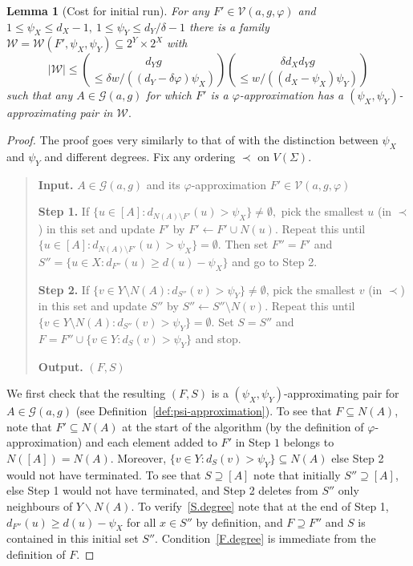 \documentclass[10pt,a4paper]{amsart}
\newtheorem{lem}[thm]{Lemma}
\theoremstyle{definition}
\newcommand{\cG}{\mathcal{G} }
\newcommand{\cV}{\mathcal{V} }
\newcommand{\cW}{\mathcal{W} }
\newcommand{\beq}[1]{\begin{equation}\label{#1}}
\newcommand{\enq}[0]{\end{equation}}
\newcommand{\nin}[0]{\noindent}
\newcommand{\sub}[0]{\subseteq}
\newcommand{\0}[0]{\emptyset}
\begin{document}
\begin{lem}[Cost for initial run]\label{lem.psi} For any $F' \in \cV(a,g,\varphi)$ and $1 \le \psi_X \leq d_X-1, \ 1\leq \psi_Y \le d_Y/\delta-1$ there is a family $\cW=\cW(F', \psi_X, \psi_Y) \sub 2^Y \times 2^X$ with
\beq{psi_bd}|\cW|\le {d_Yg \choose \le \delta w/((d_Y-\delta \varphi)\psi_X)}{\delta d_X d_Y g \choose \le w/((d_X-\psi_X)\psi_Y)}\enq
such that any $A \in \cG(a,g)$ for which $F'$ is a $\varphi$-approximation has a $(\psi_X, \psi_Y)$-approximating pair in $\cW.$
\end{lem}

\begin{proof}
    The proof goes very similarly to that of \cite[Lemma 5.5]{Galvin_independent} with the distinction between $\psi_X$ and $\psi_Y$ and different degrees. Fix any ordering $\prec$ on $V(\Sigma).$

\begin{quote}
    \nin \textbf{Input.} $A \in \cG(a,g)$ and its $\varphi$-approximation $F' \in \cV(a,g,\varphi)$

    \nin \textbf{Step 1.}  If $\{u \in [A]:d_{N(A)\setminus F'}(u)>\psi_X\} \ne \emptyset,$ pick the smallest $u$ (in $\prec$) in this set and update $F'$ by $F' \leftarrow F' \cup N(u).$ Repeat this until $\{u \in [A]:d_{N(A) \setminus F'}(u)>\psi_X\}=\emptyset.$ Then set $F''=F'$ and $S''=\{u \in X:d_{F''}(u) \ge d(u)-\psi_X\}$ and go to Step 2.

    \nin \textbf{Step 2.} If $\{v \in Y \setminus N(A): d_{S''}(v)>\psi_Y\} \ne \emptyset$, pick the smallest $v$ (in $\prec$) in this set and update $S''$ by $S'' \leftarrow S'' \setminus N(v).$ Repeat this until $\{v \in Y \setminus N(A):d_{S''}(v)>\psi_Y\}=\emptyset.$ Set $S=S''$ and $F=F'' \cup \{v \in Y:d_{S}(v)>\psi_Y\}$ and stop.

    \nin \textbf{Output.} $(F, S)$
\end{quote}

    We first check that the resulting $(F, S)$ is a $(\psi_X, \psi_Y)$-approximating pair for $A \in \cG(a,g)$ (see Definition~\ref{def:psi-approximation}). To see that $F\subseteq  N(A)$, note that $F'\subseteq N(A)$ at the start of the algorithm (by the definition of $\varphi$-approximation) and each element added to $F'$ in Step $1$ belongs to $N([A])=N(A)$. Moreover, $\{v \in Y: d_S(v)>\psi_Y\}\subseteq N(A)$ else Step 2 would not have terminated. To see that $S\supseteq [A]$ note that initially  $S''\supseteq [A]$, else Step 1 would not have terminated, and Step 2 deletes from $S''$ only neighbours of $Y\backslash N(A)$. To verify~\eqref{S.degree} note that at the end of Step 1, $d_{F''}(u)\geq d(u)-\psi_X$ for all $x\in S''$ by definition, and $F\supseteq F''$ and $S$ is contained in this initial set $S''$. Condition~\eqref{F.degree} is immediate from the definition of $F$.
    

\end{proof}
\end{document}
